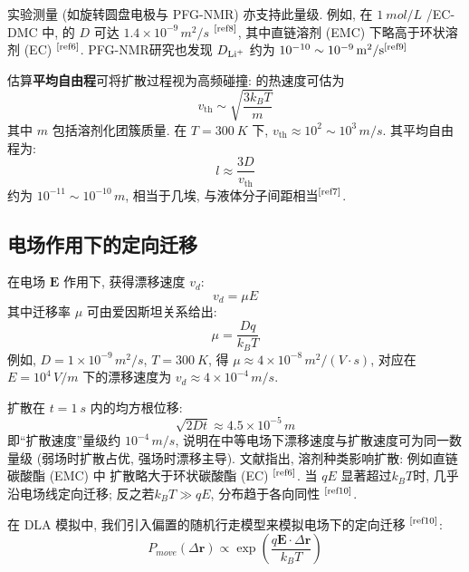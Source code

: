 \documentclass{article}
\begin{document}
		实验测量 (如旋转圆盘电极与 PFG-NMR) 亦支持此量级. 例如, 在 $\SI{1}{mol/L}$  /EC-DMC 中,  的 $D$ 可达 $1.4 \times 10^{-9}\,\si{m^{2}/s}$ $^\textup{\cite{ref8}}$, 其中直链溶剂 (EMC) 下略高于环状溶剂 (EC) $^\textup{\cite{ref6}}$. PFG-NMR研究也发现 $D_{\ce{Li+}}$ 约为 $10^{-10} \sim 10^{-9}\,\si{m^{2}/s}^\textup{\cite{ref9}}$
		
 
 	估算\textbf{平均自由程}可将扩散过程视为高频碰撞:  的热速度可估为
 		\begin{equation}
 		v_{\mathrm{th}} \sim \sqrt{\frac{3 k_{B} T}{m}}
 		\end{equation}
 		其中 $m$ 包括溶剂化团簇质量. 在 $T = \SI{300}{K}$ 下, $v_{\mathrm{th}} \approx 10^{2} \sim 10^{3}\,\si{m/s}$. 其平均自由程为:
 		\begin{equation}
 		l \approx \frac{3D}{v_{\mathrm{th}}}
 		\end{equation}
 		约为 $10^{-11} \sim 10^{-10}\,\si{m}$, 相当于几埃, 与液体分子间距相当$^\textup{\cite{ref7}}$.


	\subsection{电场作用下的定向迁移}
		在电场 $\mathbf{E}$ 作用下,  获得漂移速度 $v_{d}$:
		\begin{equation}
		v_{d} = \mu E
		\end{equation}
		其中迁移率 $\mu$ 可由爱因斯坦关系给出:
		\begin{equation}
		\mu = \frac{Dq}{k_{B} T}
		\end{equation}
		例如, $D = 1 \times 10^{-9}\,\si{m^{2}/s}$, $T=\SI{300}{K}$, 得 $\mu \approx 4 \times 10^{-8}\,\si{m^{2}/(V\cdot s)}$, 对应在 $E = 10^{4}\,\si{V/m}$ 下的漂移速度为 $v_{d} \approx 4 \times 10^{-4}\,\si{m/s}$.

		扩散在 $t=\SI{1}{s}$ 内的均方根位移:
		\begin{equation}
		\sqrt{2Dt} \approx 4.5 \times 10^{-5}\,\si{m}
		\end{equation}
		即``扩散速度''量级约 $10^{-4}\,\si{m/s}$, 说明在中等电场下漂移速度与扩散速度可为同一数量级 (弱场时扩散占优, 强场时漂移主导). 文献指出, 溶剂种类影响扩散: 例如直链碳酸酯 (EMC) 中  扩散略大于环状碳酸酯 (EC) $^\textup{\cite{ref6}}$. 当 $qE$ 显著超过$k_BT$时,  几乎沿电场线定向迁移; 反之若$k_BT\gg qE$, 分布趋于各向同性 $^\textup{\cite{ref10}}$.

		在 DLA 模拟中, 我们引入偏置的随机行走模型来模拟电场下的定向迁移 $^\textup{\cite{ref10}}$:
		\begin{equation}
		P_{move}(\Delta \mathbf{r}) \propto \exp\left( \frac{q \mathbf{E} \cdot \Delta \mathbf{r}}{k_{B} T} \right)
		\end{equation}
\end{document}
